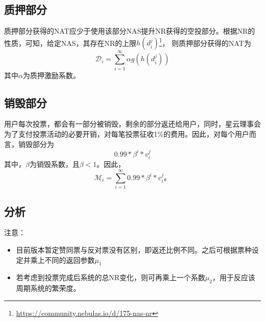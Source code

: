 \subsection{质押部分}
质押部分获得的NAT应少于使用该部分NAS提升NR获得的空投部分。根据NR的性质，可知，给定NAS，其存在NR的上限$h(d_i^j)$\footnote{\url{https://community.nebulas.io/d/175-nas-nr}}，
则质押部分获得的NAT为
\[
\mathcal{D}_i = \sum_{i=1}^{\infty}\alpha g(h(d_i^j))
\]
\noindent 其中$\alpha$为质押激励系数。


\subsection{销毁部分}
用户每次投票，都会有一部分被销毁，剩余的部分返还给用户，同时，星云理事会为了支付投票活动的必要开销，对每笔投票征收1\%的费用。因此，对每个用户而言，销毁部分为
\[
0.99 * \beta^i * v_i^j
\]
\noindent 其中，$\beta$为销毁系数，且$\beta < 1$。因此，
\[
    \mathcal{M}_i = \sum_{i=1}^{\infty} 0.99 * \beta^i * v_i^j 。
\]

\subsection{分析}

注意：
\begin{itemize}
\item 目前版本暂定赞同票与反对票没有区别，即返还比例不同。之后可根据票种设定并乘上不同的返回参数$\mu_1$
\item 若考虑到投票完成后系统的总NR变化，则可再乘上一个系数$\mu_2$，用于反应该周期系统的繁荣度。
\end{itemize}


